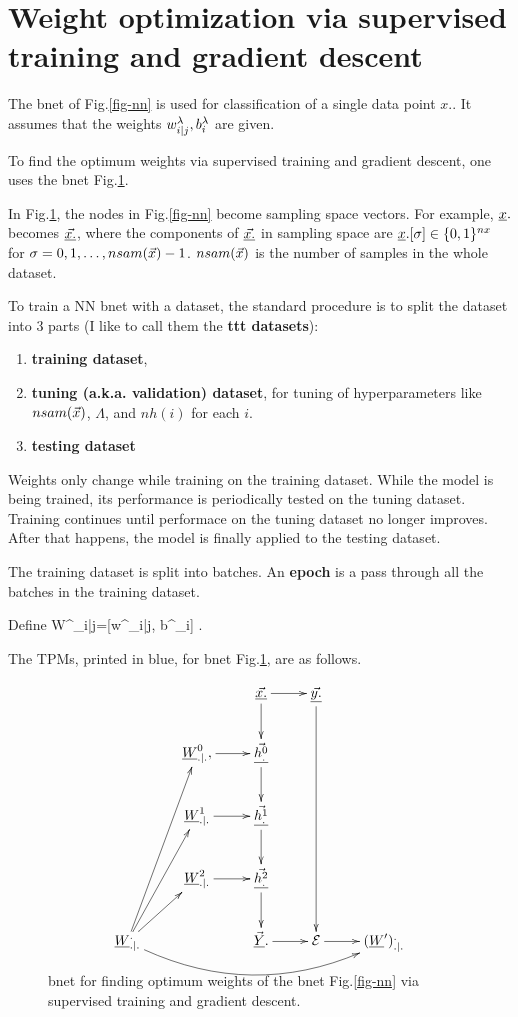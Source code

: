 \section{Weight
optimization via
supervised training and
gradient descent}

The bnet of Fig.\ref{fig-nn}
is used for classification
of a single data point $x.$.
It assumes that the
weights $w^\lambda_{i|j}, b_i^\lambda$
are given.

To find the optimum
weights via supervised
training and gradient descent,
one uses the bnet Fig.\ref{fig-nn-ext}.

In Fig.\ref{fig-nn-ext},
the nodes in
Fig.\ref{fig-nn} become
sampling space vectors.
For example, ${\underline{x}}.$ becomes
$\underline{\vec{x.}}$, where the
components of
$\underline{\vec{x.}}$ in sampling space are
${\underline{x}}.[\sigma]\in \{0,1\}^{nx}$
for $\sigma=0, 1, \ldots, nsam({\vec{x}})-1$.
$nsam({\vec{x}})$
is the number of
samples in the whole dataset.


To train a NN bnet with a dataset,
the standard procedure
is to split the dataset into 3 parts
(I like to call them the {\bf ttt datasets}):
\begin{enumerate}
\item
{\bf training dataset},
\item
{\bf tuning (a.k.a. validation) dataset}, for
tuning
of hyperparameters
like $nsam({\vec{x}})$,  $\Lambda$,
and $nh(i)$
for each $i$.
\item
{\bf testing dataset}
\end{enumerate}

Weights only change while training on the training dataset.
While the model is being trained, its performance is periodically tested on the tuning dataset. Training continues until performace on the tuning dataset no longer improves. After that happens, the model is finally applied to the testing dataset.

The training dataset is
split into batches.
An {\bf epoch} is a pass through all
the batches in the training dataset.

Define
\beq
W^\lam_{i|j}=[w^\lam_{i|j}, b^\lam_i]
\;.
\eeq

The
TPMs,
printed in blue, for
 bnet
Fig.\ref{fig-nn-ext},
are as follows.

\begin{figure}[h!]
\centering
$$\xymatrix{
&&\ranvec{x.}\ar[d]\ar[r]&
\ranvec{y.}\ar[dddd]\\
&\rvW^0_{.|.}, \ar[r]&
\ranvec{h^0_.}\ar[d]\\
&\rvW^1_{.|.}\ar[r]&
\ranvec{h^1_.}\ar[d]\\
&\rvW^2_{.|.}\ar[r]&
\ranvec{h^2_.}\ar[d]\\
\rvW^._{.|.}\ar[ru]\ar[ruu]\ar[ruuu]
\ar@/_2pc/[rrrr]
&&
\vec{\rvY}.\ar[r]&\cale\ar[r]&
(\rvW')^._{.|.}
}$$
\caption{bnet
for
finding optimum
weights of the bnet
Fig.\ref{fig-nn} via
supervised training
and gradient descent.
}
\label{fig-nn-ext}
\end{figure}

